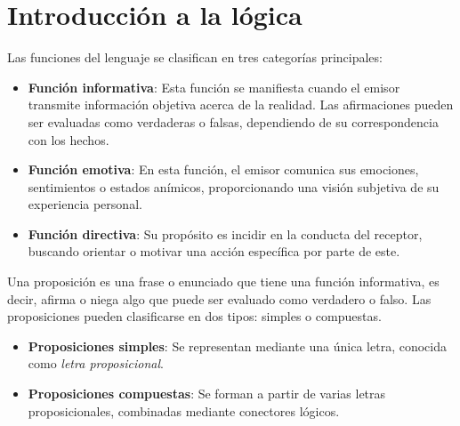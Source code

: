 \documentclass[a4,11pt]{aleph-notas}
\begin{document}
\encabezado

\section{Introducción a la lógica}

\begin{defi}
    Las funciones del lenguaje se clasifican en tres categorías principales:
    
    \begin{itemize}
        \item \textbf{Función informativa}: Esta función se manifiesta cuando el emisor transmite información objetiva acerca de la realidad. Las afirmaciones pueden ser evaluadas como verdaderas o falsas, dependiendo de su correspondencia con los hechos.
        
        \item \textbf{Función emotiva}: En esta función, el emisor comunica sus emociones, sentimientos o estados anímicos, proporcionando una visión subjetiva de su experiencia personal.
        
        \item \textbf{Función directiva}: Su propósito es incidir en la conducta del receptor, buscando orientar o motivar una acción específica por parte de este.
    \end{itemize}
\end{defi}



\begin{defi}[Proposición]
    Una proposición es una frase o enunciado que tiene una función informativa, es decir, afirma o niega algo que puede ser evaluado como verdadero o falso. Las proposiciones pueden clasificarse en dos tipos: simples o compuestas.
    
    \begin{itemize}
        \item \textbf{Proposiciones simples}: Se representan mediante una única letra, conocida como \emph{letra proposicional}.
        \item \textbf{Proposiciones compuestas}: Se forman a partir de varias letras proposicionales, combinadas mediante conectores lógicos.
    \end{itemize}
\end{defi}
\end{document}
